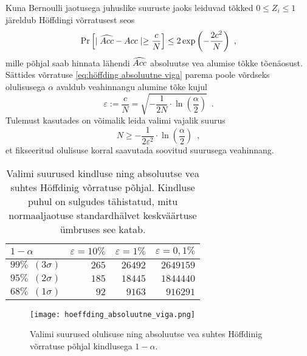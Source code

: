 Kuna Bernoulli jaotusega juhuslike suuruste jaoks leiduvad tõkked $0\leq Z_i\leq1$ järeldub Höffdingi võrratusest seos
\begin{equation}
    \label{eq:höffding absoluutne viga}
    \Pr\left[\mid \widehat{Acc} - Acc \mid \geq \frac{c}{N}\right] \leq 2 \exp{\left( - \frac{2 c^2}{N} \right)} \enspace,
\end{equation}
mille põhjal saab hinnata lähendi $\widehat{Acc}$ absoluutse vea alumise tõkke tõenäosust. Sättides võrratuse \eqref{eq:höffding absoluutne viga} parema poole võrdseks olulisusega $\alpha$ avaldub veahinnangu alumine tõke kujul
\begin{equation*}
     \varepsilon := \frac{c}{N} = \sqrt{- \frac{1}{2 N} \cdot \ln{\left( \frac{\alpha}{2} \right)}} \enspace.
\end{equation*}
Tulemust kasutades on võimalik leida valimi vajalik suurus
\begin{equation*}
    N \geq -\frac{1}{2\varepsilon^2}\cdot\ln{\left(\frac{\alpha}{2}\right)} \enspace,
\end{equation*}
et fikseeritud olulisuse korral saavutada soovitud suurusega veahinnang.

\begin{table}[H]
    \centering
    \caption{Valimi suurused kindluse ning absoluutse vea suhtes Höffdinig võrratuse põhjal. Kindluse puhul on sulgudes tähistatud, mitu normaaljaotuse standardhälvet keskväärtuse ümbruses see katab.}
    \begin{tabular}{l | r r r}
        $1-\alpha$ & $\varepsilon=10\%$ & $\varepsilon=1\%$ & $\varepsilon=0{,}1\%$ \\
    	\hline
    	$99\% \enspace (3\sigma)$ & $265$ & $26492$ & $2649159$ \\
    	$95\% \enspace (2\sigma)$ & $185$ & $18445$ & $1844440$ \\
    	$68\% \enspace (1\sigma)$ & $92$  & $9163$  & $916291$  \\
    \end{tabular}
    \label{tab:höffding absoluutne viga}
\end{table}

\begin{figure}[H]
    \begin{center}
        \texttt{[image: hoeffding\_absoluutne\_viga.png]}
    \end{center}
    \caption{Valimi suurused olulisuse ning absoluutse vea suhtes Höffdinig võrratuse põhjal kindlusega $1-\alpha$.}
    \label{fig:höffding absoluutne viga}
\end{figure}

